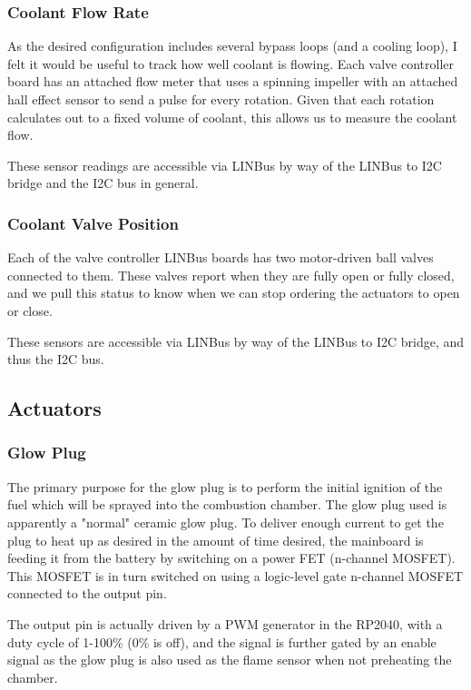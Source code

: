 \documentclass[lettersize,journal]{IEEEtran}
\begin{document}
\subsubsection{Coolant Flow Rate}
As the desired configuration includes several bypass loops (and a cooling loop), I felt it would be useful to track how well coolant is flowing.  Each valve controller board has an attached flow meter that uses a spinning impeller with an attached hall effect sensor to send a pulse for every rotation.  Given that each rotation calculates out to a fixed volume of coolant, this allows us to measure the coolant flow.

These sensor readings are accessible via LINBus by way of the LINBus to I2C bridge and the I2C bus in general.

\subsubsection{Coolant Valve Position}
Each of the valve controller LINBus boards has two motor-driven ball valves connected to them.  These valves report when they are fully open or fully closed, and we pull this status to know when we can stop ordering the actuators to open or close. 

These sensors are accessible via LINBus by way of the LINBus to I2C bridge, and thus the I2C bus.


\subsection{Actuators}
\subsubsection{Glow Plug}
The primary purpose for the glow plug is to perform the initial ignition of the fuel which will be sprayed into the combustion chamber.  The glow plug used is apparently a "normal" ceramic glow plug.  To deliver enough current to get the plug to heat up as desired in the amount of time desired, the mainboard is feeding it from the battery by switching on a power FET (n-channel MOSFET).  This MOSFET is in turn switched on using a logic-level gate n-channel MOSFET connected to the output pin.

The output pin is actually driven by a PWM generator in the RP2040, with a duty cycle of 1-100\% (0\% is off), and the signal is further gated by an enable signal as the glow plug is also used as the flame sensor when not preheating the chamber.
\end{document}
